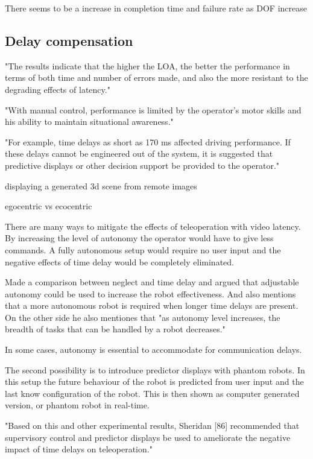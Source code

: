 There seems to be a increase in completion time and failure rate as DOF increase


\subsection{Delay compensation}

\citep{Luck2006} "The results indicate that the higher the LOA, the better the performance in terms of both time and number of errors made, and also the more resistant to the degrading effects of latency."

\citep{Fong2001} "With manual control, performance is limited by the operator's motor skills and his ability to maintain situational awareness."

\citep{Chen2007} "For example, time delays as short as 170 ms affected driving performance. If these delays cannot be engineered out of the system, it is suggested that predictive displays or other decision support be provided to the operator."

displaying a generated 3d scene from remote images

egocentric vs ecocentric

There are many ways to mitigate the effects of teleoperation with video latency. By increasing the level of autonomy the operator would have to give less commands. A fully autonomous setup would require no user input and the negative effects of time delay would be completely eliminated.

\citep{Goodrich2001} Made a comparison between neglect and time delay and argued that adjustable autonomy could be used to increase the robot effectiveness. And also mentions that a more autonomous robot is required when longer time delays are present. On the other side he also mentiones that "as autonomy level increases, the breadth of tasks that can be handled by a robot decreases."

In some cases, autonomy is essential to accommodate for communication delays. \citep{Dorais1999}

The second possibility is to introduce predictor displays with phantom robots. In this setup the future behaviour of the robot is predicted from user input and the last know configuration of the robot. This is then shown as computer generated version, or phantom robot in real-time.

\citep{Chen2007} "Based on this and other experimental results, Sheridan [86] recommended that supervisory control and predictor displays be used to ameliorate the negative impact of time delays on teleoperation."


